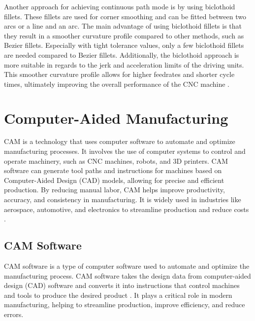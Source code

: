 Another approach for achieving continuous path mode is by using biclothoid fillets. These fillets are used for corner smoothing and can be fitted between two arcs or a line and an arc. The main advantage of using biclothoid fillets is that they result in a smoother curvature profile compared to other methods, such as Bezier fillets. Especially with tight tolerance values, only a few biclothoid fillets are needed compared to Bezier fillets. Additionally, the biclothoid approach is more suitable in regards to the jerk and acceleration limits of the driving units. This smoother curvature profile allows for higher feedrates and shorter cycle times, ultimately improving the overall performance of the CNC machine \cite{Shahzadeh.2018}. 







\newpage
\section{Computer-Aided Manufacturing}\label{CAMmain}

CAM is a technology that uses computer software to automate and optimize manufacturing processes. It involves the use of computer systems to control and operate machinery, such as CNC machines, robots, and 3D printers. CAM software can generate tool paths and instructions for machines based on Computer-Aided Design (CAD) models, allowing for precise and efficient production. By reducing manual labor, CAM helps improve productivity, accuracy, and consistency in manufacturing. It is widely used in industries like aerospace, automotive, and electronics to streamline production and reduce costs \cite{Bi.2021}.

\subsection{CAM Software}

CAM software is a type of computer software used to automate and optimize the manufacturing process. CAM software takes the design data from computer-aided design (CAD) software and converts it into instructions that control machines and tools to produce the desired product \cite{Bi.2021}. It plays a critical role in modern manufacturing, helping to streamline production, improve efficiency, and reduce errors.

